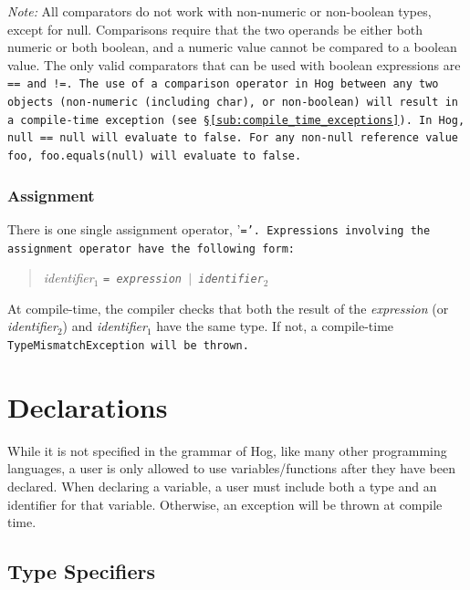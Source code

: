 \documentclass{article}
\begin{document}
\emph{Note:} All comparators do not work with non-numeric or non-boolean types,
except for null. Comparisons require that the two operands be either both numeric
or both boolean, and a numeric value cannot be compared to a boolean value. The
only valid comparators that can be used with boolean expressions are \tt == \rm
and \tt !=\rm. The use of a comparison operator in Hog between any two objects
(non-numeric (including char), or non-boolean) will result in a compile-time
exception (see \S \ref{sub:compile_time_exceptions}). In Hog, \tt null ==
null \rm will evaluate to \tt false\rm. For any non-null reference value \tt
foo\rm, \tt foo.equals(null) \rm will evaluate to \tt false\rm.


\subsubsection{Assignment} %
\label{ssub:assignment}

There is one single assignment operator, '\tt =\rm'. Expressions involving the
assignment operator have the following form:

\begin{quotation}
\emph{identifier}$_1$ \tt = \rm \emph{expression} $|$ \emph{identifier}$_2$
\end{quotation}

At compile-time, the compiler checks that both the result of the \emph{expression}
(or \emph{identifier}$_2$) and \emph{identifier}$_1$ have the same type. If not, a
compile-time \tt TypeMismatchException \rm will be thrown.




\section{Declarations} %
\label{sec:declarations}

While it is not specified in the grammar of Hog, like many other programming
languages, a user is only allowed to use variables/functions after they have been
declared. When declaring a variable, a user must include both a type and an
identifier for that variable. Otherwise, an exception will be thrown at compile
time.

\subsection{Type Specifiers} %
\label{sub:type_specifiers}
\end{document}
